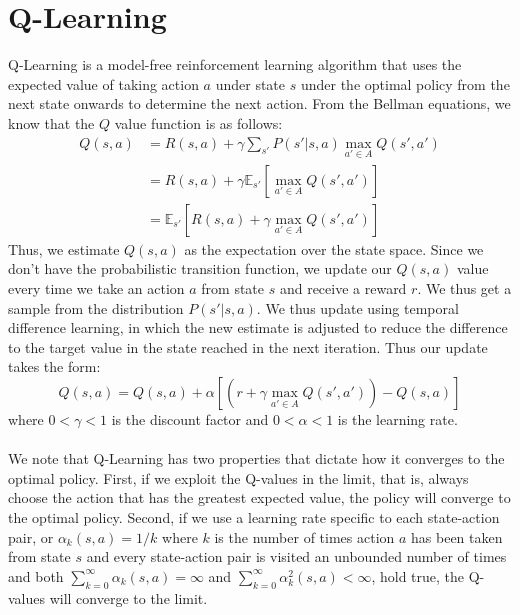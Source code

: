 \documentclass[10pt, oneside]{article}
\begin{document}
\section{Q-Learning}
Q-Learning is a model-free reinforcement learning algorithm that uses the expected value of taking action $a$ under state $s$ under the optimal policy from the next state onwards to determine the next action. From the Bellman equations, we know that the $Q$ value function is as follows:
\begin{align*}
Q(s, a) &= R(s, a) + \gamma \sum_{s'}P(s' | s, a) \max_{a' \in A} Q(s', a')\\
&= R(s, a) + \gamma\mathbb{E}_{s'}[\max_{a'\in A} Q(s', a')]\\
&= \mathbb{E}_{s'}[R(s, a) + \gamma\max_{a' \in A} Q(s', a')]
\end{align*} 
Thus, we estimate $Q(s, a)$ as the expectation over the state space. Since we don't have the probabilistic transition function, we update our $Q(s, a)$ value every time we take an action $a$ from state $s$ and receive a reward $r$. We thus get a sample from the distribution $P(s'|s, a)$. We thus update using temporal difference learning, in which the new estimate is adjusted to reduce the difference to the target value in the state reached in the next iteration. Thus our update takes the form:
\[Q(s, a)  = Q(s, a) + \alpha[(r + \gamma\max_{a'\in A} Q(s', a'))-Q(s, a)]\]
where $0 < \gamma < 1$ is the discount factor and $0<\alpha<1$ is the learning rate. \\\\
We note that Q-Learning has two properties that dictate how it converges to the optimal policy. First, if we exploit the Q-values in the limit, that is, always choose the action that has the greatest expected value, the policy will converge to the optimal policy. Second, if we use a learning rate specific to each state-action pair, or $\alpha_k(s, a) = 1/k$ where $k$ is the number of times action $a$ has been taken from state $s$ and every state-action pair is visited an unbounded number of times and both $\sum_{k=0}^\infty \alpha_k(s, a) = \infty$ and $\sum_{k=0}^\infty \alpha_k^2(s, a) < \infty$,  hold true, the Q-values will converge to the limit. 
\end{document}
